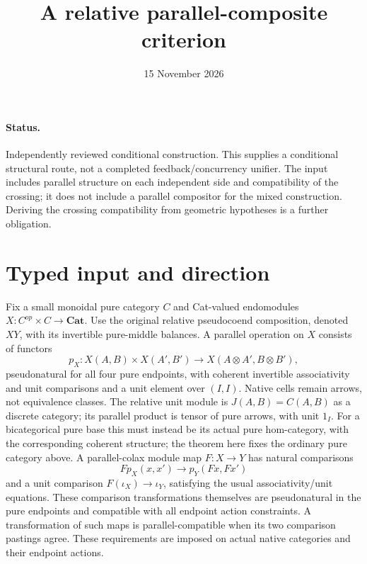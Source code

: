 \documentclass[11pt]{article}
\title{A relative parallel-composite criterion}
\date{15 November 2026}
\begin{document}
\maketitle
\paragraph{Status.} Independently reviewed conditional construction. This supplies a conditional structural route, not a completed feedback/concurrency unifier. The input includes parallel structure on each independent side and compatibility of the crossing; it does not include a parallel compositor for the mixed construction. Deriving the crossing compatibility from geometric hypotheses is a further obligation.

\section{Typed input and direction}
Fix a small monoidal pure category $C$ and Cat-valued endomodules $X:C^{op}\times C\to\mathbf{Cat}$. Use the original relative pseudocoend composition, denoted $XY$, with its invertible pure-middle balances. A parallel operation on $X$ consists of functors
\[
 p_X:X(A,B)\times X(A',B')\longrightarrow X(A\otimes A',B\otimes B'),
\]
pseudonatural for all four pure endpoints, with coherent invertible associativity and unit comparisons and a unit element over $(I,I)$. Native cells remain arrows, not equivalence classes. The relative unit module is $J(A,B)=C(A,B)$ as a discrete category; its parallel product is tensor of pure arrows, with unit $1_I$. For a bicategorical pure base this must instead be its actual pure hom-category, with the corresponding coherent structure; the theorem here fixes the ordinary pure category above. A parallel-colax module map $F:X\to Y$ has natural comparisons
\[
 Fp_X(x,x')\longrightarrow p_Y(Fx,Fx')
\]
and a unit comparison $F(\iota_X)\to\iota_Y$, satisfying the usual associativity/unit equations. These comparison transformations themselves are pseudonatural in the pure endpoints and compatible with all endpoint action constraints. A transformation of such maps is parallel-compatible when its two comparison pastings agree. These requirements are imposed on actual native categories and their endpoint actions.
\end{document}
